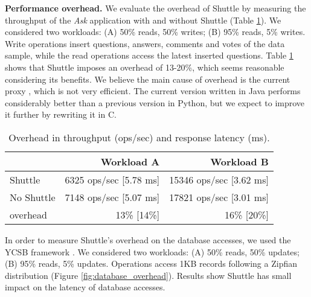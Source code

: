 \documentclass[10pt,conference]{IEEEtran}
\begin{document}
\textbf{Performance overhead.}
We evaluate the overhead of Shuttle by measuring the throughput of the \textit{Ask} application with and without Shuttle (Table \ref{tab:throughput}). We considered two workloads: (A) 50\% reads, 50\% writes;  (B)  95\% reads, 5\% writes. Write operations insert questions, answers, comments and votes of the data sample, while the read operations access the latest inserted questions. Table \ref{tab:throughput} shows that Shuttle imposes an overhead of 13-20\%, which seems reasonable considering its benefits. We believe the main cause of overhead is the current proxy \DIFaddbegin {}\DIFaddend , which is not very efficient. The current version written in Java performs considerably better than a previous version in Python, but we expect to improve it further by rewriting it in C.

\begin{table}
\footnotesize
\begin{tabular}{l|rr}
                       &  Workload A                    & Workload B  \\ \hline
Shuttle                &  6325 ops/sec [5.78 ms]        &  15346 ops/sec [3.62 ms]  \\
No Shuttle             &  7148 ops/sec [5.07 ms]        &  17821 ops/sec [3.01 ms]  \\
overhead               &  13\% [14\%]                    & 16\% [20\%] \\
\end{tabular}
\caption{Overhead in throughput (ops/sec) and response latency (ms).}
\label{tab:throughput}
\vspace{-3mm}
\end{table}

In order to measure Shuttle's overhead on the database accesses, we used the \acf{YCSB} framework \cite{ycsb}. We considered two workloads: (A)  50\% reads, 50\% updates; (B)  95\% reads, 5\% updates. Operations access 1KB records following a Zipfian distribution (Figure \ref{fig:database_overhead}). Results show Shuttle has small impact on the latency of database accesses. 
\end{document}
